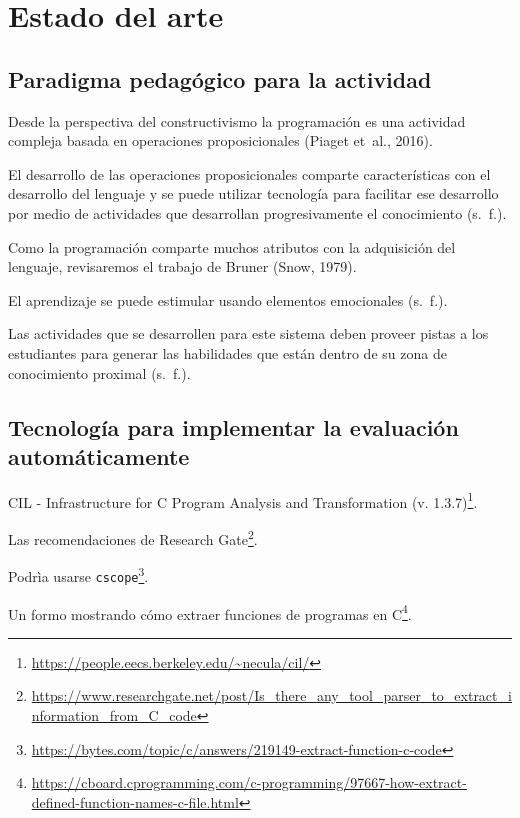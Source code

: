\documentclass[
  12,
]{scrartcl}
\DeclareRobustCommand{\href}[2]{#2\footnote{\url{#1}}}
\begin{document}
\hypertarget{estado-del-arte}{%
\section{Estado del arte}\label{estado-del-arte}}

\hypertarget{paradigma-pedaguxf3gico-para-la-actividad}{%
\subsection{Paradigma pedagógico para la
actividad}\label{paradigma-pedaguxf3gico-para-la-actividad}}

Desde la perspectiva del constructivismo la programación es una
actividad compleja basada en operaciones proposicionales (Piaget et~al.,
2016).

El desarrollo de las operaciones proposicionales comparte
características con el desarrollo del lenguaje y se puede utilizar
tecnología para facilitar ese desarrollo por medio de actividades que
desarrollan progresivamente el conocimiento (s.~f.).

Como la programación comparte muchos atributos con la adquisición del
lenguaje, revisaremos el trabajo de Bruner (Snow, 1979).

El aprendizaje se puede estimular usando elementos emocionales (s.~f.).

Las actividades que se desarrollen para este sistema deben proveer
pistas a los estudiantes para generar las habilidades que están dentro
de su zona de conocimiento proximal (s.~f.).

\hypertarget{tecnologuxeda-para-implementar-la-evaluaciuxf3n-automuxe1ticamente}{%
\subsection{Tecnología para implementar la evaluación
automáticamente}\label{tecnologuxeda-para-implementar-la-evaluaciuxf3n-automuxe1ticamente}}

\href{https://people.eecs.berkeley.edu/~necula/cil/}{CIL -
Infrastructure for C Program Analysis and Transformation (v. 1.3.7)}.

\href{https://www.researchgate.net/post/Is_there_any_tool_parser_to_extract_information_from_C_code}{Las
recomendaciones de Research Gate}.

\href{https://bytes.com/topic/c/answers/219149-extract-function-c-code}{Podrìa
usarse \texttt{cscope}}.

\href{https://cboard.cprogramming.com/c-programming/97667-how-extract-defined-function-names-c-file.html}{Un
formo mostrando cómo extraer funciones de programas en C}.
\end{document}
